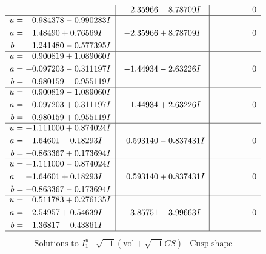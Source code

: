 \documentclass[1p]{elsarticle_modified}
\theoremstyle{definition}
\newcommand{\I}{\sqrt{-1}}
\begin{document}
$$\begin{array}{c|c|c}
 & -2.35966 - 8.78709 I & \phantom{-0.000000 } 0 \\ \hline\begin{aligned}
u &= \phantom{-}0.984378 - 0.990283 I \\
a &= \phantom{-}1.48490 + 0.76569 I \\
b &= \phantom{-}1.241480 - 0.577395 I\end{aligned}
 & -2.35966 + 8.78709 I & \phantom{-0.000000 } 0 \\ \hline\begin{aligned}
u &= \phantom{-}0.900819 + 1.089060 I \\
a &= -0.097203 - 0.311197 I \\
b &= \phantom{-}0.980159 - 0.955119 I\end{aligned}
 & -1.44934 - 2.63226 I & \phantom{-0.000000 } 0 \\ \hline\begin{aligned}
u &= \phantom{-}0.900819 - 1.089060 I \\
a &= -0.097203 + 0.311197 I \\
b &= \phantom{-}0.980159 + 0.955119 I\end{aligned}
 & -1.44934 + 2.63226 I & \phantom{-0.000000 } 0 \\ \hline\begin{aligned}
u &= -1.111000 + 0.874024 I \\
a &= -1.64601 - 0.18293 I \\
b &= -0.863367 + 0.173694 I\end{aligned}
 & \phantom{-}0.593140 - 0.837431 I & \phantom{-0.000000 } 0 \\ \hline\begin{aligned}
u &= -1.111000 - 0.874024 I \\
a &= -1.64601 + 0.18293 I \\
b &= -0.863367 - 0.173694 I\end{aligned}
 & \phantom{-}0.593140 + 0.837431 I & \phantom{-0.000000 } 0 \\ \hline\begin{aligned}
u &= \phantom{-}0.511783 + 0.276135 I \\
a &= -2.54957 + 0.54639 I \\
b &= -1.36817 - 0.43861 I\end{aligned}
 & -3.85751 - 3.99663 I & \phantom{-0.000000 } 0\\
 \hline 
 \end{array}$$\newpage$$\begin{array}{c|c|c}  
\text{Solutions to }I^u_{1}& \I (\text{vol} + \sqrt{-1}CS) & \text{Cusp shape}\\

\end{array}$$
\end{document}
